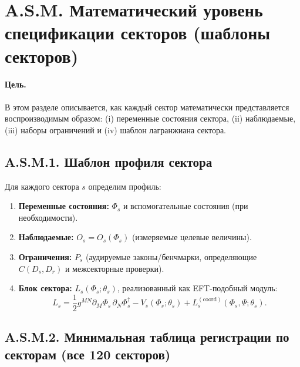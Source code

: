 \documentclass[11pt,a4paper]{article}
\begin{document}
	\section*{A.S.M. Математический уровень спецификации секторов (шаблоны секторов)}
	\label{sec:sector-math-layer}
	
	\paragraph{Цель.}
	В этом разделе описывается, как каждый сектор математически представляется воспроизводимым образом: (i) переменные состояния сектора, (ii) наблюдаемые, (iii) наборы ограничений и (iv) шаблон лагранжиана сектора.
	
	\subsection*{A.S.M.1. Шаблон профиля сектора}
	
	Для каждого сектора $s$ определим профиль:
	\begin{enumerate}[leftmargin=*]
		\item \textbf{Переменные состояния:} $\Phi_s$ и вспомогательные состояния (при необходимости).
		\item \textbf{Наблюдаемые:} $O_s=O_s(\Phi_s)$ (измеряемые целевые величины).
		\item \textbf{Ограничения:} $P_s$ (аудируемые законы/бенчмарки, определяющие $C(D_s,D_r)$ и межсекторные проверки).
		\item \textbf{Блок сектора:} $L_s(\Phi_s;\theta_s)$, реализованный как EFT-подобный модуль:
		$$ L_s = \frac{1}{2}g^{MN}\partial_M\Phi_s\,\partial_N\Phi_s^\dagger - V_s(\Phi_s;\theta_s) + L^{(\mathrm{coord})}_s(\Phi_s,\Psi;\theta_s). $$
	\end{enumerate}
	
	\subsection*{A.S.M.2. Минимальная таблица регистрации по секторам (все 120 секторов)}
	
\end{document}
